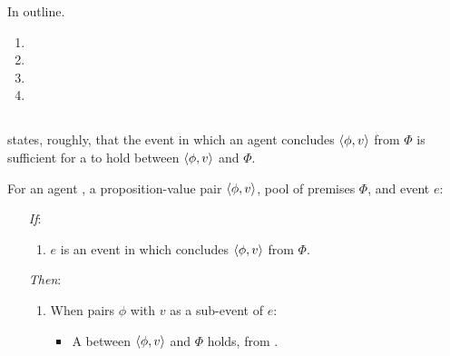 \begin{note}
  In outline.
  \begin{enumerate}[label=]
  \item
  \item
  \item
  \item
  \end{enumerate}
\end{note}

\subsection{\supportI{}}
\label{cha:var:ros:I}

\begin{note}
  \supportI{} states, roughly, that the event in which an agent concludes \(\langle \phi, v \rangle\) from \(\Phi\) is sufficient for a \ros{} to hold between \(\langle \phi, v \rangle\) and \(\Phi\).

  \begin{idea}[\supportI{}]
    \label{idea:support}
    For an agent \vAgent{}, a proposition-value pair \(\langle \phi, v \rangle\), pool of premises \(\Phi\), and event \(e\):

    \begin{itemize}
    \item[\emph{If}:]
      \begin{enumerate}[label=\alph*., ref=(\alph*)]
      \item
        \(e\) is an event in which \vAgent{} concludes \(\langle \phi, v \rangle\) from \(\Phi\).
      \end{enumerate}
    \item[\emph{Then}:]
      \begin{enumerate}[label=\alph*., ref=(\alph*), resume]
      \item
        When \vAgent{} pairs \(\phi\) with \(v\) as a sub-event of \(e\):
        \begin{itemize}
        \item
          A \emph{\ros{}} between \(\langle \phi, v \rangle\) and \(\Phi\) holds, from .
        \end{itemize}
      \end{enumerate}
    \end{itemize}
    \vspace{-\baselineskip}
  \end{idea}


\end{note}
